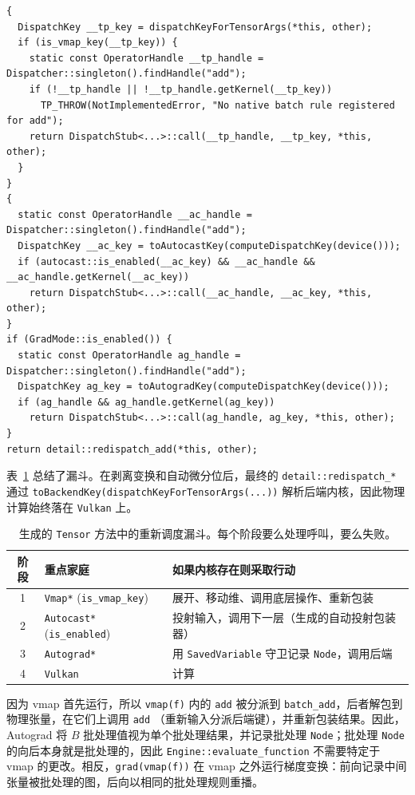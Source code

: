 \begin{lstlisting}[caption={redispatch order in every Tensor method.}, label=lst:redispatchorder]
{
  DispatchKey __tp_key = dispatchKeyForTensorArgs(*this, other);
  if (is_vmap_key(__tp_key)) {
    static const OperatorHandle __tp_handle = Dispatcher::singleton().findHandle("add");
    if (!__tp_handle || !__tp_handle.getKernel(__tp_key))
      TP_THROW(NotImplementedError, "No native batch rule registered for add");
    return DispatchStub<...>::call(__tp_handle, __tp_key, *this, other);
  }
}
{
  static const OperatorHandle __ac_handle = Dispatcher::singleton().findHandle("add");
  DispatchKey __ac_key = toAutocastKey(computeDispatchKey(device()));
  if (autocast::is_enabled(__ac_key) && __ac_handle && __ac_handle.getKernel(__ac_key))
    return DispatchStub<...>::call(__ac_handle, __ac_key, *this, other);
}
if (GradMode::is_enabled()) {
  static const OperatorHandle ag_handle = Dispatcher::singleton().findHandle("add");
  DispatchKey ag_key = toAutogradKey(computeDispatchKey(device()));
  if (ag_handle && ag_handle.getKernel(ag_key))
    return DispatchStub<...>::call(ag_handle, ag_key, *this, other);
}
return detail::redispatch_add(*this, other);
\end{lstlisting}

表~\ref{tab:vmaporder} 总结了漏斗。在剥离变换和自动微分位后，最终的 \texttt{detail::redispatch\_*} 通过 \texttt{toBackendKey(dispatchKeyForTensorArgs(...))} 解析后端内核，因此物理计算始终落在 \texttt{Vulkan} 上。

\begin{table}[H]
\centering
\caption{生成的 \texttt{Tensor} 方法中的重新调度漏斗。每个阶段要么处理呼叫，要么失败。}
\label{tab:vmaporder}
\small
\begin{tabular}{cll}
\toprule
阶段 & 重点家庭 & 如果内核存在则采取行动 \\
\midrule
1 & \texttt{Vmap*} (\texttt{is\_vmap\_key}) & 展开、移动维、调用底层操作、重新包装 \\
2 & \texttt{Autocast*} (\texttt{is\_enabled}) & 投射输入，调用下一层（生成的自动投射包装器） \\
3 & \texttt{Autograd*} & 用 \texttt{SavedVariable} 守卫记录 \texttt{Node}，调用后端 \\
4 & \texttt{Vulkan} & 计算 \\
\bottomrule
\end{tabular}
\end{table}

因为 vmap 首先运行，所以 \texttt{vmap(f)} 内的 \texttt{add} 被分派到 \texttt{batch\_add}，后者解包到物理张量，在它们上调用 \texttt{add} （重新输入分派后端键），并重新包装结果。因此，Autograd 将 $B$ 批处理值视为单个批处理结果，并记录批处理 \texttt{Node}；批处理 \texttt{Node} 的向后本身就是批处理的，因此 \texttt{Engine::evaluate\_function} 不需要特定于 vmap 的更改。相反，\texttt{grad(vmap(f))} 在 vmap 之外运行梯度变换：前向记录中间张量被批处理的图，后向以相同的批处理规则重播。

